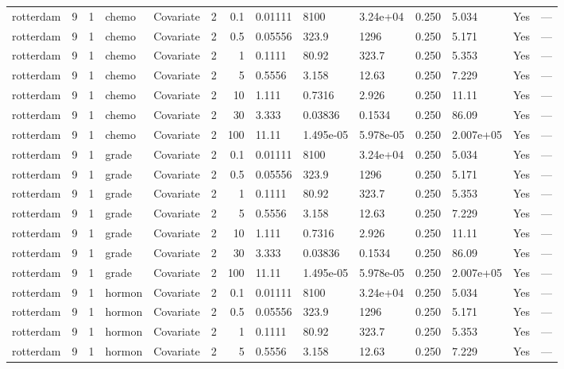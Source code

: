 \begin{tabular}{lrlllrrlllllll}
  rotterdam & 9 & 1 & chemo & Covariate & 2 &   0.1 & 0.01111 & 8100 & 3.24e+04 & 0.250 & 5.034 & Yes & --- \\ 
  rotterdam & 9 & 1 & chemo & Covariate & 2 &   0.5 & 0.05556 & 323.9 & 1296 & 0.250 & 5.171 & Yes & --- \\ 
  rotterdam & 9 & 1 & chemo & Covariate & 2 &     1 & 0.1111 & 80.92 & 323.7 & 0.250 & 5.353 & Yes & --- \\ 
  rotterdam & 9 & 1 & chemo & Covariate & 2 &     5 & 0.5556 & 3.158 & 12.63 & 0.250 & 7.229 & Yes & --- \\ 
  rotterdam & 9 & 1 & chemo & Covariate & 2 &    10 & 1.111 & 0.7316 & 2.926 & 0.250 & 11.11 & Yes & --- \\ 
  rotterdam & 9 & 1 & chemo & Covariate & 2 &    30 & 3.333 & 0.03836 & 0.1534 & 0.250 & 86.09 & Yes & --- \\ 
  rotterdam & 9 & 1 & chemo & Covariate & 2 &   100 & 11.11 & 1.495e-05 & 5.978e-05 & 0.250 & 2.007e+05 & Yes & --- \\ 
  rotterdam & 9 & 1 & grade & Covariate & 2 &   0.1 & 0.01111 & 8100 & 3.24e+04 & 0.250 & 5.034 & Yes & --- \\ 
  rotterdam & 9 & 1 & grade & Covariate & 2 &   0.5 & 0.05556 & 323.9 & 1296 & 0.250 & 5.171 & Yes & --- \\ 
  rotterdam & 9 & 1 & grade & Covariate & 2 &     1 & 0.1111 & 80.92 & 323.7 & 0.250 & 5.353 & Yes & --- \\ 
  rotterdam & 9 & 1 & grade & Covariate & 2 &     5 & 0.5556 & 3.158 & 12.63 & 0.250 & 7.229 & Yes & --- \\ 
  rotterdam & 9 & 1 & grade & Covariate & 2 &    10 & 1.111 & 0.7316 & 2.926 & 0.250 & 11.11 & Yes & --- \\ 
  rotterdam & 9 & 1 & grade & Covariate & 2 &    30 & 3.333 & 0.03836 & 0.1534 & 0.250 & 86.09 & Yes & --- \\ 
  rotterdam & 9 & 1 & grade & Covariate & 2 &   100 & 11.11 & 1.495e-05 & 5.978e-05 & 0.250 & 2.007e+05 & Yes & --- \\ 
  rotterdam & 9 & 1 & hormon & Covariate & 2 &   0.1 & 0.01111 & 8100 & 3.24e+04 & 0.250 & 5.034 & Yes & --- \\ 
  rotterdam & 9 & 1 & hormon & Covariate & 2 &   0.5 & 0.05556 & 323.9 & 1296 & 0.250 & 5.171 & Yes & --- \\ 
  rotterdam & 9 & 1 & hormon & Covariate & 2 &     1 & 0.1111 & 80.92 & 323.7 & 0.250 & 5.353 & Yes & --- \\ 
  rotterdam & 9 & 1 & hormon & Covariate & 2 &     5 & 0.5556 & 3.158 & 12.63 & 0.250 & 7.229 & Yes & --- \\ 

\end{tabular}

